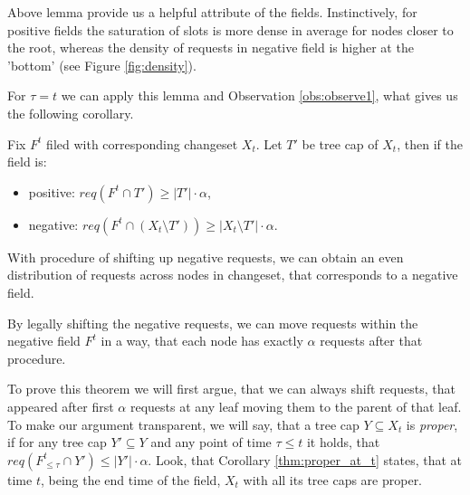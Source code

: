 Above lemma provide us a helpful attribute of the fields. Instinctively, for
positive fields the saturation of slots is more dense in average for nodes
closer to the root, whereas the density of requests in negative field is higher
at the 'bottom' (see Figure \ref{fig:density}).

For $\tau = t$ we can apply this lemma and Observation \ref{obs:observe1}, what
gives us the following corollary.  \begin{corollary} Fix $F^t$ filed with
corresponding changeset $X_t$. Let $T'$ be tree cap of $X_t$, then if the field
is: \begin{itemize} \item positive: $req(F^t \cap T') \geq |T'| \cdot \alpha$,
\item negative: $req(F^t \cap (X_t \setminus T')) \geq |X_t \setminus T'| \cdot
\alpha$.  \end{itemize} \label{thm:proper_at_t} \end{corollary}


With procedure of shifting up negative requests, we can obtain an even
distribution of requests across nodes in changeset, that corresponds to a
negative field.  \begin{theorem} By legally shifting the negative requests, we
can move requests within the negative field $F^t$ in a way, that each node has
exactly $\alpha$ requests after that procedure.  \label{thm:legal_shifting_up}
\end{theorem} To prove this theorem we will first argue, that we can always
shift requests, that appeared after first $\alpha$ requests at any leaf moving
them to the parent of that leaf. To make our argument transparent, we will say,
that a tree cap $Y \subseteq X_t$ is \textit{proper}, if for any tree cap $Y'
\subseteq Y$ and any point of time $\tau \leq t$ it holds, that $req(F^t_{\leq
\tau} \cap Y') \leq |Y'| \cdot \alpha$. Look, that Corollary
\ref{thm:proper_at_t} states, that at time $t$, being the end time of the field,
$X_t$ with all its tree caps are proper.


